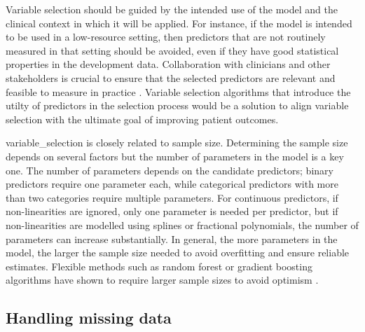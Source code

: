 Variable selection should be guided by the intended use of the model and the clinical context in which it will be applied. For instance, if the model is intended to be used in a low-resource setting, then predictors that are not routinely measured in that setting should be avoided, even if they have good statistical properties in the development data. Collaboration with clinicians and other stakeholders is crucial to ensure that the selected predictors are relevant and feasible to measure in practice \cite{smitsImprovingHealthCare2026}. Variable selection algorithms that introduce the utilty of predictors in the selection process would be a solution to align variable selection with the ultimate goal of improving patient outcomes. 

\Gls{variable_selection} is closely related to sample size. Determining the sample size depends on several factors but the number of parameters in the model is a key one. The number of parameters depends on the candidate predictors; binary predictors require one parameter each, while categorical predictors with more than two categories require multiple parameters. For continuous predictors, if non-linearities are ignored, only one parameter is needed per predictor, but if non-linearities are modelled using splines or fractional polynomials, the number of parameters can increase substantially. In general, the more parameters in the model, the larger the sample size needed to avoid \gls{overfitting} and ensure reliable estimates. Flexible methods such as random forest or gradient boosting algorithms have shown to require larger sample sizes to avoid optimism \cite{vanderploegModernModellingTechniques2014,austinRelativeDataHungriness2024}.  

\subsection{Handling missing data}

